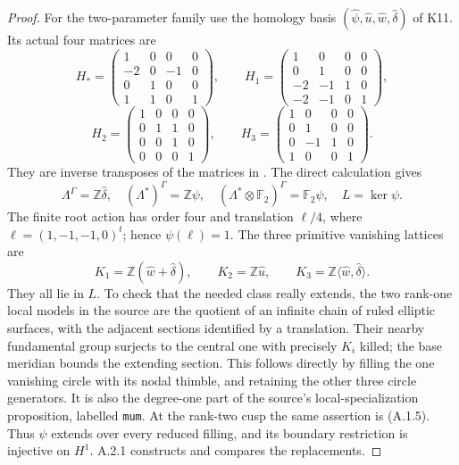 \begin{proof}
For the two-parameter family use the homology basis
$(\widehat\psi,\widehat u,\widehat w,\widehat\delta)$
of K11.  Its actual four matrices are
\[
 H_* =\begin{pmatrix}1&0&0&0\\-2&0&-1&0\\0&1&0&0\\1&1&0&1\end{pmatrix},
 \qquad
 H_1 =\begin{pmatrix}1&0&0&0\\0&1&0&0\\-2&-1&1&0\\-2&-1&0&1\end{pmatrix},
\]
\[
 H_2 =\begin{pmatrix}1&0&0&0\\0&1&1&0\\0&0&1&0\\0&0&0&1\end{pmatrix},
 \qquad
 H_3 =\begin{pmatrix}1&0&0&0\\0&1&0&0\\0&-1&1&0\\1&0&0&1\end{pmatrix}.
\]
They are inverse transposes of the matrices in
\cite[Proposition 4.2]{mapsVia2}.  The direct
calculation gives
\[
 \Lambda^\Gamma=\mathbb Z\widehat\delta,
 \quad (\Lambda^*)^\Gamma=\mathbb Z\psi,
 \quad (\Lambda^*\otimes\mathbb F_2)^\Gamma
          =\mathbb F_2\psi,
 \quad L=\ker\psi.
 \tag{B.4.1}
\]
The finite root action has order four and translation
$\ell/4$, where $\ell=(1,-1,-1,0)^t$; hence
$\psi(\ell)=1$.  The three primitive vanishing
lattices are
\[
 K_1=\mathbb Z(\widehat w+\widehat\delta),\qquad
 K_2=\mathbb Z\widehat u,\qquad
 K_3=\mathbb Z\langle\widehat w,\widehat\delta\rangle.
 \tag{B.4.2}
\]
They all lie in $L$.  To check that the needed
class really extends, the two rank-one local
models in the source are the quotient of an
infinite chain of ruled elliptic surfaces, with
the adjacent sections identified by a translation.
Their nearby fundamental group surjects to the
central one with precisely $K_i$ killed; the
base meridian bounds the extending section.
This follows directly by filling the one
vanishing circle with its nodal thimble, and
retaining the other three circle generators.
It is also the degree-one part of the source's
local-specialization proposition, labelled
\texttt{mum}.  At the rank-two cusp the same
assertion is (A.1.5).  Thus $\psi$ extends
over every reduced filling, and its boundary
restriction is injective on $H^1$.  A.2.1
constructs and compares the replacements.


\end{proof}
